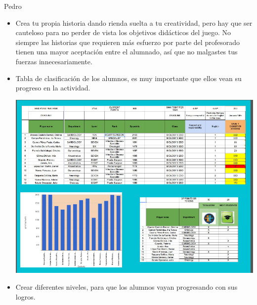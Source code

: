 \begin{opin}{\pedrocolor}{Pedro}
\begin{itemize}
\item Crea tu propia historia dando rienda suelta a tu creatividad, pero hay que ser cauteloso para no perder de vista los objetivos didácticos del juego. No siempre las historias que requieren más esfuerzo por parte del profesorado tienen una mayor aceptación entre el alumnado, así que no malgastes tus fuerzas innecesariamente. 

\item Tabla de clasificación de los alumnos, es muy importante que ellos vean su progreso en la actividad. 

\begin{minipage}[hbtp]{1.0\linewidth}
\centering
\includegraphics[scale=0.35]{img/gamingpedro3.png}
\end{minipage}

\item Crear diferentes niveles, para que los alumnos vayan progresando con sus logros. 


\end{itemize}
\end{opin}
